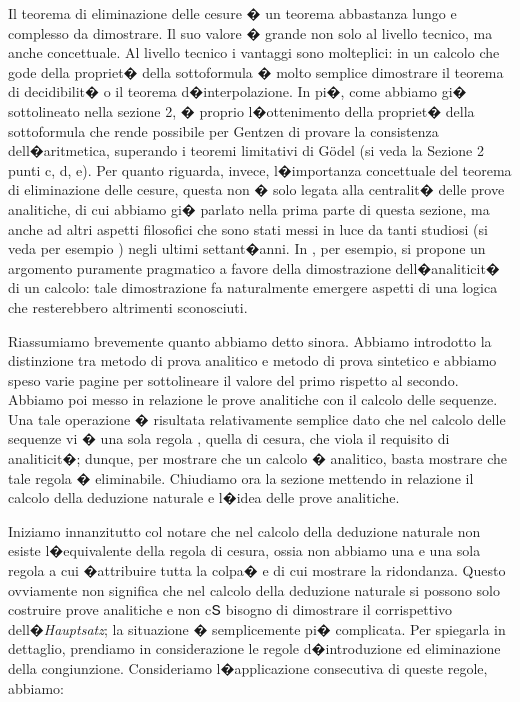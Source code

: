 \documentclass[a4paper,12pt]{aphex}
\begin{document}
Il teorema di eliminazione delle cesure � un teorema abbastanza lungo e complesso da dimostrare. Il suo valore � grande  non solo al livello tecnico, ma anche concettuale. Al livello tecnico i vantaggi sono molteplici: in un calcolo che gode della propriet� della sottoformula � molto semplice dimostrare il teorema di decidibilit� o il teorema d�interpolazione. In pi�, come abbiamo gi� sottolineato nella sezione 2, � proprio l�ottenimento della propriet� della sottoformula che rende possibile per Gentzen di provare la consistenza dell�aritmetica, superando i teoremi limitativi di G\"odel (si veda la Sezione 2 punti c, d, e).
  Per quanto riguarda, invece, l�importanza concettuale del teorema di eliminazione delle cesure, questa non � solo legata alla centralit� delle prove analitiche, di cui abbiamo gi� parlato nella prima parte di questa sezione, ma anche ad altri aspetti  filosofici che sono stati messi in luce da tanti studiosi (si veda per esempio \cite{avron, Indrezejczak})  negli ultimi settant�anni. In \cite{poggiolesi3}, per esempio, si propone un argomento puramente pragmatico a favore della dimostrazione dell�analiticit� di un calcolo: tale dimostrazione fa naturalmente emergere aspetti di una logica che resterebbero altrimenti sconosciuti.


Riassumiamo brevemente quanto abbiamo detto sinora. Abbiamo introdotto la distinzione tra metodo di prova analitico e metodo di prova sintetico e abbiamo speso varie pagine per sottolineare il valore del primo rispetto al secondo. Abbiamo poi messo in relazione le prove analitiche con il calcolo delle sequenze. Una tale operazione � risultata relativamente semplice dato che nel calcolo delle sequenze vi � una sola regola , quella di cesura, che viola il requisito di analiticit�;  dunque, per mostrare che un calcolo � analitico, basta mostrare che tale regola � eliminabile. Chiudiamo ora la sezione mettendo in relazione il calcolo della deduzione naturale e l�idea delle prove analitiche. 


Iniziamo innanzitutto col notare che nel calcolo della deduzione naturale non esiste l�equivalente della regola di cesura, ossia non abbiamo una e una sola regola a cui �attribuire tutta la colpa� e di cui mostrare la ridondanza. Questo ovviamente non significa che nel calcolo della deduzione naturale si possono solo costruire prove analitiche e non cՏ bisogno di dimostrare il corrispettivo dell�\emph{Hauptsatz}; la situazione � semplicemente pi� complicata. Per spiegarla in dettaglio, prendiamo in considerazione le regole d�introduzione ed eliminazione della congiunzione. Consideriamo l�applicazione consecutiva di queste regole, abbiamo:
\end{document}

